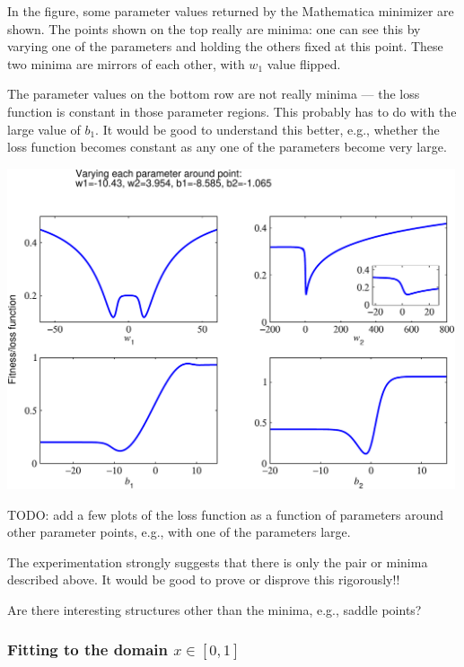 \documentclass[12pt,a4paper]{article}
\begin{document}
In the figure, some parameter values returned by the Mathematica minimizer are shown.  The points
shown on the top really are minima: one can see this by varying one of the parameters and holding
the others fixed at this point.  These two minima are mirrors of each other, with $w_1$ value flipped.

The parameter values on the bottom row are not really minima --- the loss function is constant in
those parameter regions.  This probably has to do with the large value of $b_1$.  It would be good
to understand this better, e.g., whether the loss function becomes constant as any one of the
parameters become very large.  


\smallskip

\begin{center}
\includegraphics[width=0.99\textwidth]{Images/3node_largedomain_fitness_a_01}
\end{center}


TODO: add a few plots of the loss function as a function of parameters around other parameter
points, e.g., with one of the parameters large.  


The experimentation strongly suggests that there is only the pair or minima described above.  It
would be good to prove or disprove this rigorously!!   

Are there interesting structures other than the minima, e.g., saddle points?  


\newpage

\subsubsection{Fitting to the domain $x\in[0,1]$}
\end{document}
